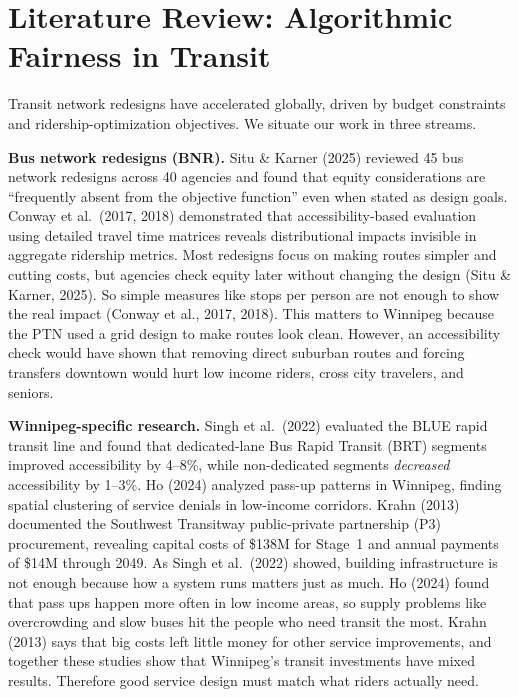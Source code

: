 \documentclass[11pt]{article}
\begin{document}
\section{Literature Review: Algorithmic Fairness in Transit}

Transit network redesigns have accelerated globally, driven by budget constraints and ridership-optimization objectives. We situate our work in three streams.

\textbf{Bus network redesigns (BNR).} Situ \& Karner (2025) reviewed 45 bus network redesigns across 40 agencies and found that equity considerations are ``frequently absent from the objective function'' even when stated as design goals. Conway et al.\ (2017, 2018) demonstrated that accessibility-based evaluation using detailed travel time matrices reveals distributional impacts invisible in aggregate ridership metrics. Most redesigns focus on making routes simpler and cutting costs, but agencies check equity later without changing the design (Situ \& Karner, 2025). So simple measures like stops per person are not enough to show the real impact (Conway et al., 2017, 2018). This matters to Winnipeg because the PTN used a grid design to make routes look clean. However, an accessibility check would have shown that removing direct suburban routes and forcing transfers downtown would hurt low income riders, cross city travelers, and seniors.

\textbf{Winnipeg-specific research.} Singh et al.\ (2022) evaluated the BLUE rapid transit line and found that dedicated-lane Bus Rapid Transit (BRT) segments improved accessibility by 4--8\%, while non-dedicated segments \emph{decreased} accessibility by 1--3\%. Ho (2024) analyzed pass-up patterns in Winnipeg, finding spatial clustering of service denials in low-income corridors. Krahn (2013) documented the Southwest Transitway public-private partnership (P3) procurement, revealing capital costs of \$138M for Stage~1 and annual payments of \$14M through 2049. As Singh et al.\ (2022) showed, building infrastructure is not enough because how a system runs matters just as much. Ho (2024) found that pass ups happen more often in low income areas, so supply problems like overcrowding and slow buses hit the people who need transit the most. Krahn (2013) says that big costs left little money for other service improvements, and together these studies show that Winnipeg's transit investments have mixed results. Therefore good service design must match what riders actually need.
\end{document}
